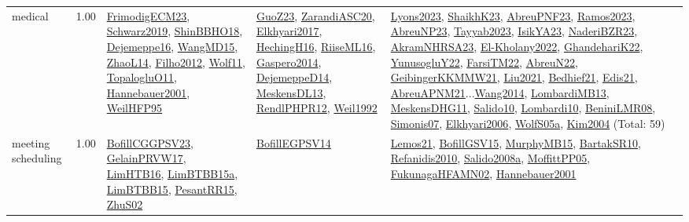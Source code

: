 {\begin{longtable}{p{3cm}r>{\raggedright\arraybackslash}p{6cm}>{\raggedright\arraybackslash}p{6cm}>{\raggedright\arraybackslash}p{8cm}}
\index{medical}\index{ApplicationAreas!medical}medical &  1.00 & \hyperref[detail:FrimodigECM23]{FrimodigECM23}, \hyperref[detail:Schwarz2019]{Schwarz2019}, \hyperref[detail:ShinBBHO18]{ShinBBHO18}, \hyperref[detail:Dejemeppe16]{Dejemeppe16}, \hyperref[detail:WangMD15]{WangMD15}, \hyperref[detail:ZhaoL14]{ZhaoL14}, \hyperref[detail:Filho2012]{Filho2012}, \hyperref[detail:Wolf11]{Wolf11}, \hyperref[detail:TopalogluO11]{TopalogluO11}, \hyperref[detail:Hannebauer2001]{Hannebauer2001}, \hyperref[detail:WeilHFP95]{WeilHFP95} & \hyperref[detail:GuoZ23]{GuoZ23}, \hyperref[detail:ZarandiASC20]{ZarandiASC20}, \hyperref[detail:Elkhyari2017]{Elkhyari2017}, \hyperref[detail:HechingH16]{HechingH16}, \hyperref[detail:RiiseML16]{RiiseML16}, \hyperref[detail:Gaspero2014]{Gaspero2014}, \hyperref[detail:DejemeppeD14]{DejemeppeD14}, \hyperref[detail:MeskensDL13]{MeskensDL13}, \hyperref[detail:RendlPHPR12]{RendlPHPR12}, \hyperref[detail:Weil1992]{Weil1992} & \hyperref[detail:Lyons2023]{Lyons2023}, \hyperref[detail:ShaikhK23]{ShaikhK23}, \hyperref[detail:AbreuPNF23]{AbreuPNF23}, \hyperref[detail:Ramos2023]{Ramos2023}, \hyperref[detail:AbreuNP23]{AbreuNP23}, \hyperref[detail:Tayyab2023]{Tayyab2023}, \hyperref[detail:IsikYA23]{IsikYA23}, \hyperref[detail:NaderiBZR23]{NaderiBZR23}, \hyperref[detail:AkramNHRSA23]{AkramNHRSA23}, \hyperref[detail:El-Kholany2022]{El-Kholany2022}, \hyperref[detail:GhandehariK22]{GhandehariK22}, \hyperref[detail:YunusogluY22]{YunusogluY22}, \hyperref[detail:FarsiTM22]{FarsiTM22}, \hyperref[detail:AbreuN22]{AbreuN22}, \hyperref[detail:GeibingerKKMMW21]{GeibingerKKMMW21}, \hyperref[detail:Liu2021]{Liu2021}, \hyperref[detail:Bedhief21]{Bedhief21}, \hyperref[detail:Edis21]{Edis21}, \hyperref[detail:AbreuAPNM21]{AbreuAPNM21}...\hyperref[detail:Wang2014]{Wang2014}, \hyperref[detail:LombardiMB13]{LombardiMB13}, \hyperref[detail:MeskensDHG11]{MeskensDHG11}, \hyperref[detail:Salido10]{Salido10}, \hyperref[detail:Lombardi10]{Lombardi10}, \hyperref[detail:BeniniLMR08]{BeniniLMR08}, \hyperref[detail:Simonis07]{Simonis07}, \hyperref[detail:Elkhyari2006]{Elkhyari2006}, \hyperref[detail:WolfS05a]{WolfS05a}, \hyperref[detail:Kim2004]{Kim2004} (Total: 59)\\
\index{meeting scheduling}\index{ApplicationAreas!meeting scheduling}meeting scheduling &  1.00 & \hyperref[detail:BofillCGGPSV23]{BofillCGGPSV23}, \hyperref[detail:GelainPRVW17]{GelainPRVW17}, \hyperref[detail:LimHTB16]{LimHTB16}, \hyperref[detail:LimBTBB15a]{LimBTBB15a}, \hyperref[detail:LimBTBB15]{LimBTBB15}, \hyperref[detail:PesantRR15]{PesantRR15}, \hyperref[detail:ZhuS02]{ZhuS02} & \hyperref[detail:BofillEGPSV14]{BofillEGPSV14} & \hyperref[detail:Lemos21]{Lemos21}, \hyperref[detail:BofillGSV15]{BofillGSV15}, \hyperref[detail:MurphyMB15]{MurphyMB15}, \hyperref[detail:BartakSR10]{BartakSR10}, \hyperref[detail:Refanidis2010]{Refanidis2010}, \hyperref[detail:Salido2008a]{Salido2008a}, \hyperref[detail:MoffittPP05]{MoffittPP05}, \hyperref[detail:FukunagaHFAMN02]{FukunagaHFAMN02}, \hyperref[detail:Hannebauer2001]{Hannebauer2001}\\

\end{longtable}}
